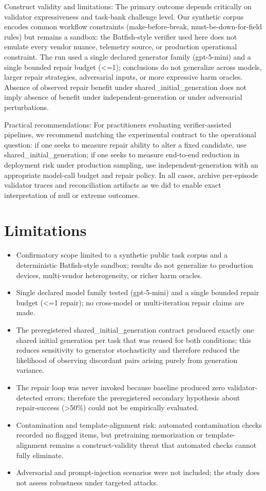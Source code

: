 \documentclass[conference]{IEEEtran}
\begin{document}
Construct validity and limitations: The primary outcome depends critically on validator expressiveness and task-bank challenge level. Our synthetic corpus encodes common workflow constraints (make-before-break, must-be-down-for-field rules) but remains a sandbox: the Batfish-style verifier used here does not emulate every vendor nuance, telemetry source, or production operational constraint. The run used a single declared generator family (gpt-5-mini) and a single bounded repair budget (<=1); conclusions do not generalize across models, larger repair strategies, adversarial inputs, or more expressive harm oracles. Absence of observed repair benefit under shared\_initial\_generation does not imply absence of benefit under independent-generation or under adversarial perturbations.

Practical recommendations: For practitioners evaluating verifier-assisted pipelines, we recommend matching the experimental contract to the operational question: if one seeks to measure repair ability to alter a fixed candidate, use shared\_initial\_generation; if one seeks to measure end-to-end reduction in deployment risk under production sampling, use independent-generation with an appropriate model-call budget and repair policy. In all cases, archive per-episode validator traces and reconciliation artifacts as we did to enable exact interpretation of null or extreme outcomes.

\section{Limitations}
\begin{itemize}
\item Confirmatory scope limited to a synthetic public task corpus and a deterministic Batfish-style sandbox; results do not generalize to production devices, multi-vendor heterogeneity, or richer harm oracles.
\item Single declared model family tested (gpt-5-mini) and a single bounded repair budget (<=1 repair); no cross-model or multi-iteration repair claims are made.
\item The preregistered shared\_initial\_generation contract produced exactly one shared initial generation per task that was reused for both conditions; this reduces sensitivity to generator stochasticity and therefore reduced the likelihood of observing discordant pairs arising purely from generation variance.
\item The repair loop was never invoked because baseline produced zero validator-detected errors; therefore the preregistered secondary hypothesis about repair-success (>50\%) could not be empirically evaluated.
\item Contamination and template-alignment risk: automated contamination checks recorded no flagged items, but pretraining memorization or template-alignment remains a construct-validity threat that automated checks cannot fully eliminate.
\item Adversarial and prompt-injection scenarios were not included; the study does not assess robustness under targeted attacks.
\end{itemize}
\end{document}
